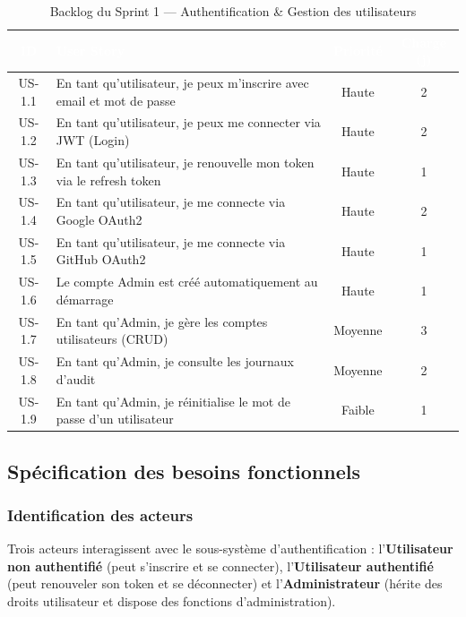 \begin{table}[H]
\centering
\renewcommand{\arraystretch}{1.4}
\begin{tabularx}{\textwidth}{|c|X|c|c|}
\hline
\rowcolor{tablehead}
\textcolor{white}{\textbf{ID}} &
\textcolor{white}{\textbf{User Story}} &
\textcolor{white}{\textbf{Priorit\'e}} &
\textcolor{white}{\textbf{Charge (j)}} \\ \hline
US-1.1 & En tant qu'utilisateur, je peux m'inscrire avec email et mot de passe & Haute & 2 \\ \hline
US-1.2 & En tant qu'utilisateur, je peux me connecter via JWT (Login) & Haute & 2 \\ \hline
US-1.3 & En tant qu'utilisateur, je renouvelle mon token via le refresh token & Haute & 1 \\ \hline
US-1.4 & En tant qu'utilisateur, je me connecte via Google OAuth2 & Haute & 2 \\ \hline
US-1.5 & En tant qu'utilisateur, je me connecte via GitHub OAuth2 & Haute & 1 \\ \hline
US-1.6 & Le compte Admin est cr\'e\'e automatiquement au d\'emarrage & Haute & 1 \\ \hline
US-1.7 & En tant qu'Admin, je g\`ere les comptes utilisateurs (CRUD) & Moyenne & 3 \\ \hline
US-1.8 & En tant qu'Admin, je consulte les journaux d'audit & Moyenne & 2 \\ \hline
US-1.9 & En tant qu'Admin, je r\'einitialise le mot de passe d'un utilisateur & Faible & 1 \\ \hline
\end{tabularx}
\caption{Backlog du Sprint 1 --- Authentification \& Gestion des utilisateurs}
\label{tab:backlog_s1}
\end{table}

\subsection{Sp\'ecification des besoins fonctionnels}

\subsubsection{Identification des acteurs}

Trois acteurs interagissent avec le sous-syst\`eme d'authentification :
l'\textbf{Utilisateur non authentifi\'e} (peut s'inscrire et se connecter),
l'\textbf{Utilisateur authentifi\'e} (peut renouveler son token et se
d\'econnecter) et l'\textbf{Administrateur} (h\'erite des droits utilisateur
et dispose des fonctions d'administration).

